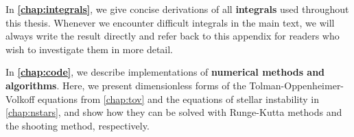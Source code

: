 In \textbf{\cref{chap:integrals}}, we give concise derivations of all \textbf{integrals} used throughout this thesis.
Whenever we encounter difficult integrals in the main text, we will always write the result directly and refer back to this appendix for readers who wish to investigate them in more detail.

In \textbf{\cref{chap:code}}, we describe implementations of \textbf{numerical methods and algorithms}.
Here, we present dimensionless forms of the Tolman-Oppenheimer-Volkoff equations from \cref{chap:tov} and the equations of stellar instability in \cref{chap:nstars}, and show how they can be solved with Runge-Kutta methods and the shooting method, respectively.
